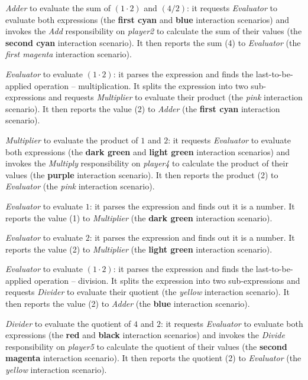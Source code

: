 \textit{Adder} to evaluate the sum of $(1\cdot2)$ and $(4/2)$: it requests \textit{Evaluator} to evaluate both expressions (the \textbf{first cyan} and \textbf{blue} interaction scenarios) and invokes the \textit{Add} responsibility on \textit{player2} to calculate the sum of their values (the \textbf{second cyan} interaction scenario).
It then reports the sum (4) to \textit{Evaluator} (the \textit{first magenta} interaction scenario).

\textit{Evaluator} to evaluate $(1\cdot2)$: it parses the expression and finds the last-to-be-applied operation -- multiplication.
It splits the expression into two sub-expressions and requests \textit{Multiplier} to evaluate their product (the \textit{pink} interaction scenario).
It then reports the value (2) to \textit{Adder} (the \textbf{first cyan} interaction scenario).

\textit{Multiplier} to evaluate the product of $1$ and $2$: it requests \textit{Evaluator} to evaluate both expressions (the \textbf{dark green} and \textbf{light green} interaction scenarios) and invokes the \textit{Multiply} responsibility on \textit{player4} to calculate the product of their values (the \textbf{purple} interaction scenario).
It then reports the product (2) to \textit{Evaluator} (the \textit{pink} interaction scenario).

\textit{Evaluator} to evaluate $1$: it parses the expression and finds out it is a number.
It reports the value (1) to \textit{Multiplier} (the \textbf{dark green} interaction scenario).

\textit{Evaluator} to evaluate $2$: it parses the expression and finds out it is a number.
It reports the value (2) to \textit{Multiplier} (the \textbf{light green} interaction scenario).

\textit{Evaluator} to evaluate $(1\cdot2)$: it parses the expression and finds the last-to-be-applied operation -- division.
It splits the expression into two sub-expressions and requests \textit{Divider} to evaluate their quotient (the \textit{yellow} interaction scenario).
It then reports the value (2) to \textit{Adder} (the \textbf{blue} interaction scenario).

\textit{Divider} to evaluate the quotient of $4$ and $2$: it requests \textit{Evaluator} to evaluate both expressions (the \textbf{red} and \textbf{black} interaction scenarios) and invokes the \textit{Divide} responsibility on \textit{player5} to calculate the quotient of their values (the \textbf{second magenta} interaction scenario).
It then reports the quotient (2) to \textit{Evaluator} (the \textit{yellow} interaction scenario).

